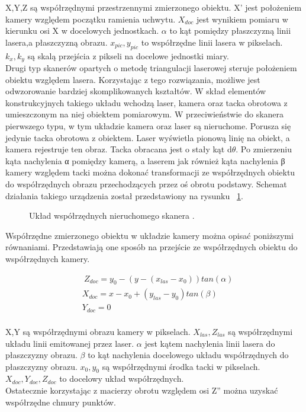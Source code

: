 \noindent X,Y,Z są współrzędnymi przestrzennymi zmierzonego obiektu. X' jest położeniem kamery względem początku ramienia uchwytu. $X_{doc}$ jest wynikiem pomiaru w kierunku osi X w docelowych jednostkach. $\alpha$ to kąt pomiędzy płaszczyzną linii lasera,a płaszczyzną obrazu. $x_{pic},y_{pic}$ to współrzędne linii lasera w pikselach. $k_{x},k_{y}$ są skalą przejścia z pikseli na docelowe jednostki miary.\\
\indent Drugi typ skanerów opartych o metodę triangulacji laserowej steruje położeniem obiektu względem lasera. Korzystając z tego rozwiązania, możliwe jest odwzorowanie bardziej skomplikowanych kształtów. W skład elementów konstrukcyjnych takiego układu wchodzą laser, kamera oraz tacka obrotowa z umieszczonym na niej obiektem pomiarowym.
W przeciwieństwie do skanera pierwszego typu, w tym układzie kamera oraz laser są nieruchome. Porusza się jedynie tacka obrotowa z obiektem. Laser wyświetla pionową linię na obiekt, a kamera rejestruje ten obraz. Tacka obracana jest o stały kąt d$\theta$. Po zmierzeniu kąta nachylenia α pomiędzy kamerą, a laserem jak również kąta nachylenia β kamery względem tacki można dokonać transformacji ze współrzędnych obiektu do współrzędnych obrazu przechodzących przez oś obrotu podstawy. Schemat działania takiego urządzenia został przedstawiony na rysunku ~\ref{fig:triangPic2}.

\begin{figure}[H]
  \centering
    

  \caption{Układ współrzędnych nieruchomego skanera \cite{mikulski2013metody}.}   
  \label{fig:triangPic2}
\end{figure}
\newline
Współrzędne zmierzonego obiektu w układzie kamery można opisać poniższymi równaniami. Przedstawiają one sposób na przejście ze współrzędnych obiektu do współrzędnych kamery.

\begin{equation}
    \begin{aligned}
        & \ Z_{doc}=y_{0}-(y-(x_{las}-x_{0}))tan(\alpha) \\
          & X_{doc}=x-x_{0}+(y_{las}-y_{0})tan(\beta) \\
          & Y_{doc}=0\\
    \end{aligned}
\end{equation}

X,Y są współrzędnymi obrazu kamery w pikselach. $X_{las},Z_{las}$ są współrzędnymi układu linii emitowanej przez laser. $\alpha$ jest kątem nachylenia linii lasera do płaszczyzny obrazu. $\beta$ to kąt nachylenia docelowego układu współrzędnych do płaszczyzny obrazu. $x_{0},y_{0}$ są współrzędnymi środka tacki w pikselach. $X_{doc},Y_{doc},Z_{doc}$ to docelowy układ współrzędnych.\\
\indent Ostatecznie korzystając z macierzy obrotu względem osi Z'' można uzyskać współrzędne chmury punktów.
\newline

